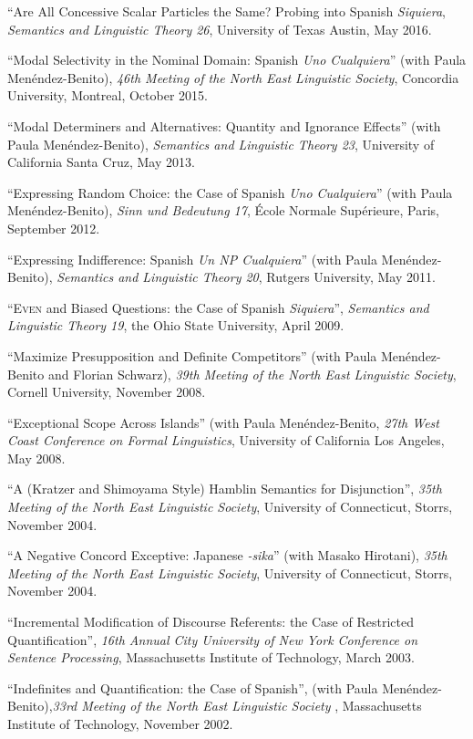\documentclass[11pt]{article}
\begin{document}
``Are All Concessive Scalar Particles the Same? Probing into Spanish \textit{Siquiera}, \textit{Semantics and Linguistic Theory 26}, University of Texas Austin, May 2016. 

``Modal Selectivity in the Nominal Domain: Spanish \textit{Uno Cualquiera}'' (with Paula Men\'endez-Benito), \textit{46th Meeting of the North East Linguistic Society}, Concordia University, Montreal, October 2015. 

``Modal Determiners and Alternatives: Quantity and Ignorance
Effects'' (with Paula Men\'endez-Benito), \textit{Semantics and
  Linguistic Theory 23}, University of California Santa Cruz, May 2013. 

``Expressing Random
Choice: the Case of Spanish \textit{Uno Cualquiera}''  (with Paula Men\'endez-Benito), \textit{Sinn
  und Bedeutung 17}, \'{E}cole Normale Sup\'{e}rieure, Paris, September 2012.

``Expressing Indifference: Spanish \textit{Un NP
  Cualquiera}'' (with Paula Men\'endez-Benito), \textit{Semantics and
Linguistic Theory 20}, Rutgers University, May 2011. 

``\textsc{Even} and Biased Questions: the Case of Spanish \textit{Siquiera}'', \textit{Semantics and Linguistic Theory 19}, the Ohio State University, April 2009. 

``Maximize Presupposition and Definite Competitors'' (with
  Paula Men\'endez-Benito and Florian Schwarz), \textit{39th
  Meeting of the North East Linguistic Society}, Cornell University, November 2008. 


``Exceptional Scope Across Islands'' (with Paula Men\'endez-Benito, \textit{27th West Coast Conference on
  Formal Linguistics}, University of California Los Angeles, May 2008. 


``A (Kratzer and Shimoyama Style) Hamblin Semantics for Disjunction'', \textit{35th
  Meeting of the North East Linguistic Society}, University of Connecticut, Storrs, November 2004. 


``A Negative Concord Exceptive: Japanese \textit{-sika}'' (with Masako Hirotani), \textit{35th
  Meeting of the North East Linguistic Society}, University of Connecticut, Storrs, November 2004. 


``Incremental Modification of Discourse Referents: the Case of Restricted Quantification'', \textit{16th Annual City University of New York Conference on Sentence Processing}, Massachusetts Institute of Technology, March 2003. 

``Indefinites and Quantification: the Case of Spanish'', (with Paula Men\'endez-Benito),\textit{33rd
  Meeting of the North East Linguistic Society} , Massachusetts Institute of Technology,  November 2002. 
\end{document}
